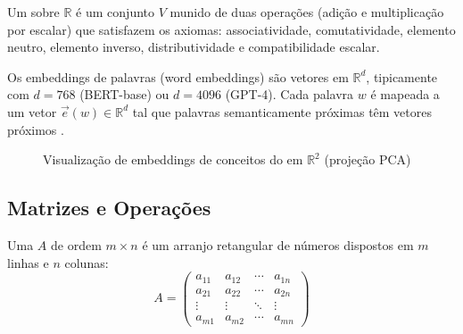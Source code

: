 \begin{definicao}
    Um  sobre $\mathbb{R}$ é um conjunto $V$
    munido de duas operações (adição e multiplicação por escalar) que
    satisfazem os axiomas: associatividade, comutatividade, elemento neutro,
    elemento inverso, distributividade e compatibilidade escalar.
\end{definicao}

\begin{exemplo}
    Os embeddings de palavras (word embeddings) são vetores em
    $\mathbb{R}^d$, tipicamente com $d = 768$ (BERT-base) ou $d = 4096$
    (GPT-4). Cada palavra $w$ é mapeada a um vetor $\vec{e}(w) \in
    \mathbb{R}^d$ tal que palavras semanticamente próximas têm vetores
    próximos \cite{devlin2019bert, vaswani2017attention}.
\end{exemplo}

\begin{figure}[htb]
    \centering
    \caption{Visualização de embeddings de conceitos do \opencodeeco{} em
             $\mathbb{R}^2$ (projeção PCA)}
    \label{fig:embeddings}
\end{figure}

\subsection{Matrizes e Operações}

\begin{definicao}[Matriz]
    Uma  $A$ de ordem $m \times n$ é um arranjo retangular
    de números dispostos em $m$ linhas e $n$ colunas:
    \[
    A = \begin{pmatrix}
        a_{11} & a_{12} & \cdots & a_{1n} \\
        a_{21} & a_{22} & \cdots & a_{2n} \\
        \vdots & \vdots & \ddots & \vdots \\
        a_{m1} & a_{m2} & \cdots & a_{mn}
    \end{pmatrix}
    \]
\end{definicao}

